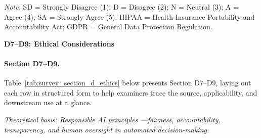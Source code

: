 \vspace{0.5em}\noindent\textit{Note.} SD = Strongly Disagree (1); D = Disagree (2); N = Neutral (3); A = Agree (4); SA = Strongly Agree (5). HIPAA = Health Insurance Portability and Accountability Act; GDPR = General Data Protection Regulation.

\noindent\textbf{D7--D9: Ethical Considerations}
\paragraph{Section D7--D9.}
\noindent Table~\ref{tab:survey_section_d_ethics} below presents Section D7--D9, laying out each row in structured form to help examiners trace the source, applicability, and downstream use at a glance. %


\noindent\textit{Theoretical basis: Responsible AI principles \cite{floridi2018ai4people}---fairness, accountability, transparency, and human oversight in automated decision-making.}

